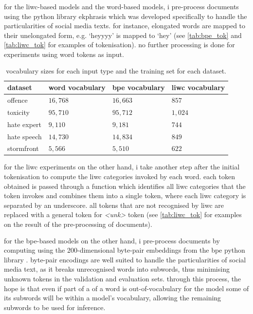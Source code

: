 for the liwc-based models and the word-based models, i pre-process documents using the python library ekphrasis \citep{baziotis:2017} which was developed specifically to handle the particularities of social media texts.
for instance, elongated words are mapped to their unelongated form, e.g. `heyyyy' is mapped to `hey' (see \cref{tab:bpe_tok} and \cref{tab:liwc_tok} for examples of tokenisation).
no further processing is done for experiments using word tokens as input.

\begin{table}[]
  \centering
  \begin{tabular}{llll}
    dataset     & word vocabulary & bpe vocabulary & liwc vocabulary \\\hline
    offence     & $16,768$        & $16,663$       & $857$           \\
    toxicity    & $95,710$        & $95,712$       & $1,024$         \\
    hate expert & $9,110$         & $9,181$        & $744$           \\
    hate speech & $14,730$        & $14,834$       & $849$           \\
    stormfront  & $5,566$         & $5,510$        & $622$
  \end{tabular}
  \caption{vocabulary sizes for each input type and the training set for each dataset.}
  \label{tab:vocab_sizes}
\end{table}

for the liwc experiments on the other hand, i take another step after the initial tokenisation to compute the liwc categories invoked by each word. 
each token obtained is passed through a function which identifies all liwc categories that the token invokes and combines them into a single token, where each liwc category is separated by an underscore.
all tokens that are not recognised by liwc are replaced with a general token for \textit{<unk>} token (see \cref{tab:liwc_tok} for examples on the result of the pre-processing of documents).

for the bpe-based models on the other hand, i pre-process documents by computing using the 200-dimensional byte-pair embeddings from the bpe python library \citep{heinzerling:2018}.
byte-pair encodings are well suited to handle the particularities of social media text, as it breaks unrecognised words into subwords, thus minimising unknown tokens in the validation and evaluation sets.
through this process, the hope is that even if part of a of a word is out-of-vocabulary for the model some of its subwords will be within a model's vocabulary, allowing the remaining subwords to be used for inference.

